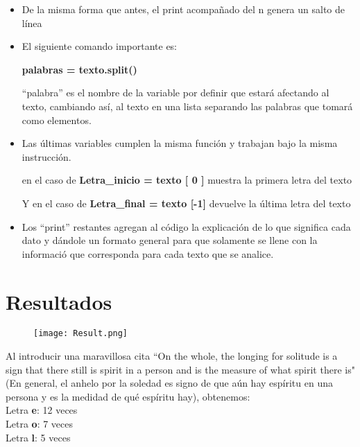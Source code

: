 \documentclass[15pt]{article}
\begin{document}
\begin{itemize}

    \item De la misma forma que antes, el print acompañado del n genera un salto de línea
    \item El siguiente comando importante es:

    \textbf{palabras = texto.split()}


    ``palabra'' es el nombre de la variable por definir que estará afectando al texto, cambiando así, al texto en una lista separando las palabras que tomará como elementos.

    \item Las últimas variables cumplen la misma función y trabajan bajo la misma instrucción.\newline

    en el caso de \textbf{Letra\_inicio = texto [ 0 ] } muestra la primera letra del texto \newline

    Y en el caso de \textbf{Letra\_final = texto [-1]} devuelve la última letra del texto

    \item Los ``print'' restantes agregan al código la explicación de lo que significa cada dato y dándole un formato general para que solamente se llene con la informació que corresponda para cada texto que se analice.

\end{itemize}

\section*{\Large{Resultados}}

\begin{figure}[h]
\centering
\texttt{[image: Result.png]}
\end{figure}

Al introducir una maravillosa cita ``On the whole, the longing for solitude is a sign that there still is spirit in a person and is the measure of what spirit there is" (En general, el anhelo por la soledad es signo de que aún hay espíritu en una persona y es la medidad de qué espíritu hay), obtenemos: \\

\noindent Letra \textbf{e}: 12 veces \\
Letra \textbf{o}: 7 veces \\
Letra \textbf{l}: 5 veces \\
\end{document}
